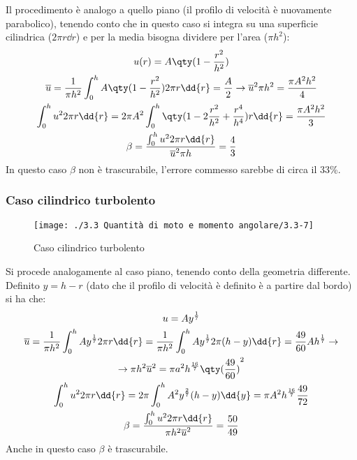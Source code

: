 Il procedimento è analogo a quello piano (il profilo di velocità è nuovamente parabolico), tenendo conto che in questo caso si integra su una superficie cilindrica ($2 \pi r \dd{r}$) e per la media bisogna dividere per l'area ($\pi h^2$):
%
	\begin{equation*}
		\begin{gathered}
			u(r) = A  \qty(1 - \frac{r^2}{h^2}) \\
			\overline{u} = \frac{1}{\pi h^2} \int_0^h A  \qty(1 - \frac{r^2}{h^2}) 2 \pi r \dd{r} = \frac{A}{2} \rightarrow \overline{u}^2 \pi h^2 = \frac{\pi A^2 h^2}{4} \\
			\int_0^h u^2 2 \pi r \dd{r} = 2 \pi A^2 \int_0^h \qty(1 -2 \frac{r^2}{h^2} + \frac{r^4}{h^4}) r \dd{r} = \frac{\pi A^2 h^2}{3} \\
			\beta = \frac{\int_0^h u^2 2 \pi r \dd{r}}{ \overline{u}^2 \pi h} =\frac{4}{3}
		\end{gathered}
	\end{equation*}
%
In questo caso $\beta$ non è trascurabile, l'errore commesso sarebbe di circa il 33\%.

\subsubsection{Caso cilindrico turbolento}
%
	\begin{figure}[ht]
		\texttt{[image: ./3.3 Quantità di moto e momento angolare/3.3-7]}
		\centering
		\caption{Caso cilindrico turbolento}
	\end{figure}
%

Si procede analogamente al caso piano, tenendo conto della geometria differente.
 Definito $y = h - r$ (dato che il profilo di velocità è definito è a partire dal bordo) si ha che:
%
	\begin{equation*}
		\begin{gathered}
			u = A y^{\frac{1}{7}} \\
			\overline{u} = \frac{1}{\pi h^2} \int_0^h A y^{\frac{1}{7}} 2 \pi r \dd{r} = \frac{1}{\pi h^2} \int_0^h A y^{\frac{1}{7}} 2 \pi (h - y) \dd{r} = \frac{49}{60} A h^{\frac{1}{7}} \rightarrow \\
			\rightarrow \pi h^2 \overline{u}^2 = \pi a^2 h^\frac{16}{7} {\qty( \frac{49}{60})}^2 \\
			\int_0^h u^2 2 \pi r \dd{r} = 2 \pi \int_0^h A^2 y^{\frac{2}{7}} (h - y) \dd{y} = \pi A^2 h^{\frac{16}{7}} \frac{49}{72} \\
			\beta = \frac{\int_0^h u^2 2 \pi r \dd{r}}{\pi h^2 \overline{u}^2} = \frac{50}{49}
		\end{gathered}
	\end{equation*}
%
Anche in questo caso $\beta$ è trascurabile.

